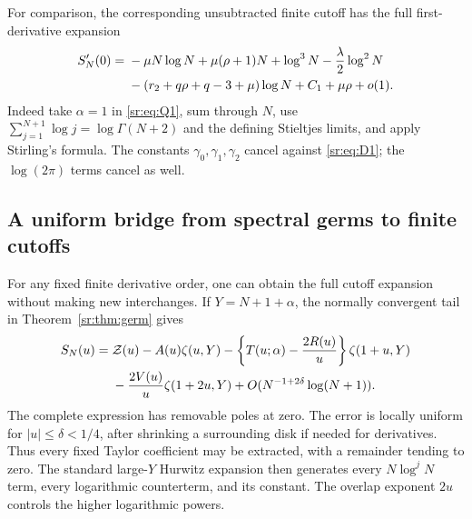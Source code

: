 \documentclass[11pt,letterpaper]{article}
\theoremstyle{definition}
\theoremstyle{remark}
\numberwithin{equation}{section}
\begin{document}
For comparison, the corresponding unsubtracted finite cutoff has
the full first-derivative expansion
\begin{align}
 S_N'(0)={}&-\mu N\log N+\mu(\rho+1)N+\log^3N
 -\frac\lambda2\log^2N\notag\\
 &-(r_2+q\rho+q-3+\mu)\log N+C_1+\mu\rho+o(1).
 \label{sr:eq:cutoff-derivative}
\end{align}
Indeed take $\alpha=1$ in \eqref{sr:eq:Q1}, sum through $N$,
use $\sum_{j=1}^{N+1}\log j=\log\Gamma(N+2)$ and the defining
Stieltjes limits, and apply Stirling's formula. The constants
$\gamma_0,\gamma_1,\gamma_2$ cancel against \eqref{sr:eq:D1}; the
$\log(2\pi)$ terms cancel as well.

\subsection{A uniform bridge from spectral germs to finite cutoffs}
For any fixed finite derivative order, one can obtain the full cutoff
expansion without making new interchanges. If $Y=N+1+\alpha$, the
normally convergent tail in Theorem~\ref{sr:thm:germ} gives
\begin{align}
 S_N(u)={}&\mathcal Z(u)-A(u)\zeta(u,Y)
 -\left\{T(u;\alpha)-\frac{2R(u)}u\right\}\zeta(1+u,Y)\notag\\
 &-\frac{2V(u)}u\zeta(1+2u,Y)
 +O(N^{-1+2\delta}\log(N+1)).
 \label{sr:eq:uniform-cutoff}
\end{align}
The complete expression has removable poles at zero. The error is
locally uniform for $|u|\le\delta<1/4$, after shrinking a surrounding
disk if needed for derivatives. Thus every fixed Taylor coefficient
may be extracted, with a remainder tending to zero. The standard
large-$Y$ Hurwitz expansion then generates every $N\log^jN$ term,
every logarithmic counterterm, and its constant. The overlap exponent
$2u$ controls the higher logarithmic powers.
\end{document}
